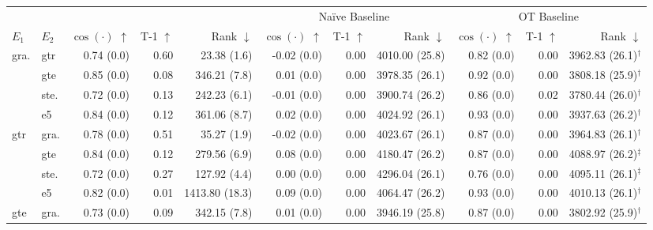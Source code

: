 \begin{table}[!ht]
    \scriptsize
    \centering
    \begin{tabular}{llrrrrrrrrr}
        \toprule
        \multicolumn{2}{c}{} & \multicolumn{3}{c}{\atk{}} & \multicolumn{3}{c}{Naïve Baseline} & \multicolumn{3}{c}{OT Baseline}\\
        \cmidrule(lr){3-5} \cmidrule(lr){6-8}  \cmidrule(lr){9-11} 
        $E_1$ & $E_2$ & $\cos(\cdot)$ $\uparrow$ & T-1 $\uparrow$ & Rank $\downarrow$ & $\cos(\cdot)$ $\uparrow$ & T-1 $\uparrow$ & Rank $\downarrow$ & $\cos(\cdot)$ $\uparrow$ & T-1 $\uparrow$ & Rank $\downarrow$\\
        \midrule
        \multirow{4}{*}{gra.} & gtr & 0.74 {\tiny (0.0)} & 0.60 & 23.38 {\tiny (1.6)} & -0.02 {\tiny (0.0)} & 0.00 & 4010.00 {\tiny (25.8)} & 0.82 {\tiny (0.0)} & 0.00 & 3962.83 {\tiny (26.1)}$^\dagger$ \\
        & gte & 0.85 {\tiny (0.0)} & 0.08 & 346.21 {\tiny (7.8)} & 0.01 {\tiny (0.0)} & 0.00 & 3978.35 {\tiny (26.1)} & 0.92 {\tiny (0.0)} & 0.00 & 3808.18 {\tiny (25.9)}$^\dagger$ \\
        & ste. & 0.72 {\tiny (0.0)} & 0.13 & 242.23 {\tiny (6.1)} & -0.01 {\tiny (0.0)} & 0.00 & 3900.74 {\tiny (26.2)} & 0.86 {\tiny (0.0)} & 0.02 & 3780.44 {\tiny (26.0)}$^\dagger$ \\
        & e5 & 0.84 {\tiny (0.0)} & 0.12 & 361.06 {\tiny (8.7)} & 0.02 {\tiny (0.0)} & 0.00 & 4024.92 {\tiny (26.1)} & 0.93 {\tiny (0.0)} & 0.00 & 3937.63 {\tiny (26.2)}$^\dagger$ \\
        \midrule
        \multirow{4}{*}{gtr} & gra. & 0.78 {\tiny (0.0)} & 0.51 & 35.27 {\tiny (1.9)} & -0.02 {\tiny (0.0)} & 0.00 & 4023.67 {\tiny (26.1)} & 0.87 {\tiny (0.0)} & 0.00 & 3964.83 {\tiny (26.1)}$^\dagger$ \\
        & gte & 0.84 {\tiny (0.0)} & 0.12 & 279.56 {\tiny (6.9)} & 0.08 {\tiny (0.0)} & 0.00 & 4180.47 {\tiny (26.2)} & 0.87 {\tiny (0.0)} & 0.00 & 4088.97 {\tiny (26.2)}$^\ddagger$ \\
        & ste. & 0.72 {\tiny (0.0)} & 0.27 & 127.92 {\tiny (4.4)} & 0.00 {\tiny (0.0)} & 0.00 & 4296.04 {\tiny (26.1)} & 0.76 {\tiny (0.0)} & 0.00 & 4095.11 {\tiny (26.1)}$^\ddagger$ \\
        & e5 & 0.82 {\tiny (0.0)} & 0.01 & 1413.80 {\tiny (18.3)} & 0.09 {\tiny (0.0)} & 0.00 & 4064.47 {\tiny (26.2)} & 0.93 {\tiny (0.0)} & 0.00 & 4010.13 {\tiny (26.1)}$^\dagger$ \\
        \midrule
        \multirow{4}{*}{gte} & gra. & 0.73 {\tiny (0.0)} & 0.09 & 342.15 {\tiny (7.8)} & 0.01 {\tiny (0.0)} & 0.00 & 3946.19 {\tiny (25.8)} & 0.87 {\tiny (0.0)} & 0.00 & 3802.92 {\tiny (25.9)}$^\dagger$ \\

\end{tabular}
\end{table}
